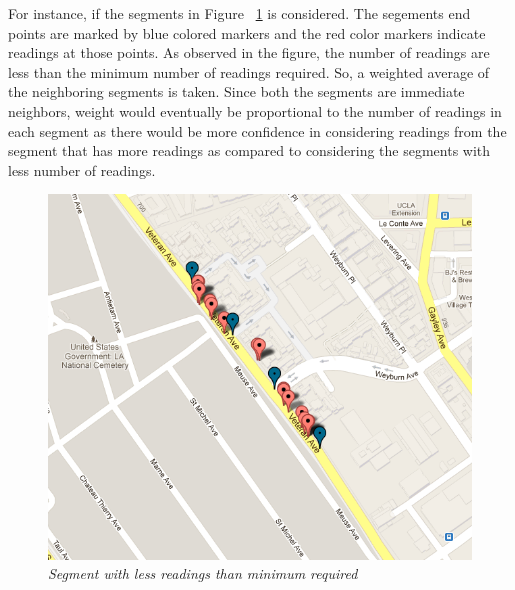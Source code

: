 \documentclass[10pt]{sigplan-proc-varsize}
\begin{document}
For instance, if the segments in Figure ~\ref{fig:lessReadings} is considered. The segements end points are marked by blue colored markers and the red color markers indicate readings at those points. As observed in the figure, the number of readings are less than the minimum number of readings required. So, a weighted average of the neighboring segments is taken. Since both the segments are immediate neighbors, weight would eventually be proportional to the number of readings in each segment as there would be more confidence in considering readings from the segment that has more readings as compared to considering the segments with less number of readings. 
\begin{figure}[h]
\begin{center}
\includegraphics[scale=0.35]{lessReadings.png}
\caption{\small \sl Segment with less readings than minimum required}
\label{fig:lessReadings}
\end{center}
\end{figure}
\end{document}
